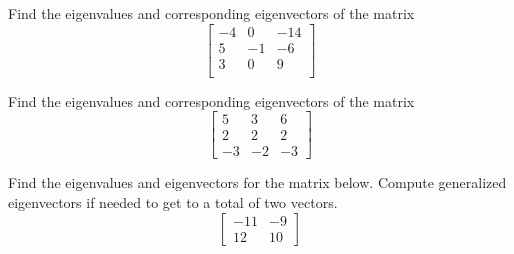 \begin{exercise}\ansMark%
Find the eigenvalues and corresponding eigenvectors of the matrix 
\[  \begin{bmatrix}
-4 & 0 & -14 \\ 
5 & -1 & -6 \\ 
3 & 0 & 9 \\ 
\end{bmatrix} \]
\end{exercise}


\begin{exercise}\ansMark%
Find the eigenvalues and corresponding eigenvectors of the matrix 
\[ \begin{bmatrix} 5 & 3 & 6 \\ 2 & 2 & 2 \\ -3 & -2 & -3 \end{bmatrix} \]
\end{exercise}



\begin{exercise}\ansMark%
Find the eigenvalues and eigenvectors for the matrix below. Compute generalized eigenvectors if needed to get to a total of two vectors. 
\[ \begin{bmatrix} -11 & -9 \\ 12 & 10 \end{bmatrix} \]
\end{exercise}

